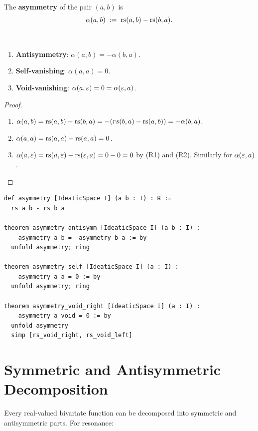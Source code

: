 \begin{definition}[Asymmetry]\label{def:asymmetry}
The \textbf{asymmetry} of the pair $(a, b)$ is
\[
    \alpha(a, b) \;:=\; \mathrm{rs}(a, b) - \mathrm{rs}(b, a).
\]
\end{definition}

\begin{proposition}\label{prop:asymmetry-basic}
\ 
\begin{enumerate}
    \item \textbf{Antisymmetry}: $\alpha(a, b) = -\alpha(b, a)$.
    \item \textbf{Self-vanishing}: $\alpha(a, a) = 0$.
    \item \textbf{Void-vanishing}: $\alpha(a, \varepsilon) = 0 = \alpha(\varepsilon, a)$.
\end{enumerate}
\end{proposition}
\begin{proof}
\begin{enumerate}
    \item $\alpha(a,b) = \mathrm{rs}(a,b) - \mathrm{rs}(b,a) = -(rs(b,a) - \mathrm{rs}(a,b))
          = -\alpha(b,a)$.
    \item $\alpha(a,a) = \mathrm{rs}(a,a) - \mathrm{rs}(a,a) = 0$.
    \item $\alpha(a, \varepsilon) = \mathrm{rs}(a, \varepsilon) - \mathrm{rs}(\varepsilon, a) = 0 - 0 = 0$
          by (R1) and (R2). Similarly for $\alpha(\varepsilon, a)$.
\end{enumerate}
\end{proof}

\begin{lstlisting}[language=Lean4, caption={Asymmetry and its properties
in Lean 4}]
def asymmetry [IdeaticSpace I] (a b : I) : ℝ :=
  rs a b - rs b a

theorem asymmetry_antisymm [IdeaticSpace I] (a b : I) :
    asymmetry a b = -asymmetry b a := by
  unfold asymmetry; ring

theorem asymmetry_self [IdeaticSpace I] (a : I) :
    asymmetry a a = 0 := by
  unfold asymmetry; ring

theorem asymmetry_void_right [IdeaticSpace I] (a : I) :
    asymmetry a void = 0 := by
  unfold asymmetry
  simp [rs_void_right, rs_void_left]
\end{lstlisting}

\section{Symmetric and Antisymmetric Decomposition}

Every real-valued bivariate function can be decomposed into symmetric and
antisymmetric parts. For resonance:

